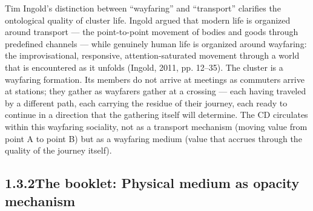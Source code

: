 Tim Ingold’s distinction between “wayfaring” and “transport” clarifies the ontological quality of cluster life. Ingold argued that modern life is organized around transport — the point-to-point movement of bodies and goods through predefined channels — while genuinely human life is organized around wayfaring: the improvisational, responsive, attention-saturated movement through a world that is encountered as it unfolds (Ingold, 2011, pp. 12–35). The cluster is a wayfaring formation. Its members do not arrive at meetings as commuters arrive at stations; they gather as wayfarers gather at a crossing — each having traveled by a different path, each carrying the residue of their journey, each ready to continue in a direction that the gathering itself will determine. The CD circulates within this wayfaring sociality, not as a transport mechanism (moving value from point A to point B) but as a wayfaring medium (value that accrues through the quality of the journey itself).

\subsection{1.3.2\quad The booklet: Physical medium as opacity mechanism}

